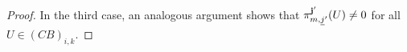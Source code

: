 \documentclass{amsart}
\numberwithin{equation}{section}
\newcommand{\bfe}{\mathbf{e}}
\newcommand{\bff}{\mathbf{f}}
\newcommand{\bfg}{\mathbf{g}}
\newcommand{\bfh}{\mathbf{h}}
\newcommand{\tbfe}{{\tilde\bfe}}
\newcommand{\tbff}{{\tilde\bff}}
\newcommand{\tbfg}{{\tilde\bfg}}
\newcommand{\tbfh}{{\tilde\bfh}}
\newcommand{\uj}{{\underline j}}
\newcommand\udim{{\underline{\dim}\, }}
\newcommand{\Gr}{\mathrm{Gr}}
\begin{document}
\begin{proof}
In the third case, an analogous argument shows that $\pi^{\bf j'}_{m,\uj'}(U)\neq 0$ for all $U\in (CB)_{i,k}$.



\begin{comment}
We proceed by induction and combine the two maps $\Psi_1$ and $\Psi_2$ and obtain a map
\[\Psi:\Gr^{\tilde Q}_\tbfe(\tilde P_{m+1}^{(k-1)})\to\bigsqcup_{\tbff+\tbfg+\tbfh=\tbfe} \Gr^{\tilde Q}_\tbff( P(m,k))\times \Gr^{\tilde Q}_\tbfg(\tau\tilde P_{m+1}^{(k)})\times \Gr^{\tilde Q}_\tbfh(\tilde P_{m+1}^{(k)}).\]

By Lemma \ref{directsums} and induction hypothesis every quiver Grassmannian on the right hand side has a cell decomposition. The second part of the Proposition says that the fibres are empty if and only if $\tbfg=0$ and $\tbfh=\udim \tilde P_{m+1}^{(k)}$. In all other cases, the fiber dimension only depend on the dimension vectors $\tbff, \tbfg,\tbfh$ which means that they are constant over $\Gr^{\tilde Q}_\tbff( P(m,k))\times \Gr^{\tilde Q}_\tbfg(\tau\tilde P_{m+1}^{(k)})\times \Gr^{\tilde Q}_\tbfh(\tilde P_{m+1}^{(k)})$\footnote{actually this should already say that this is a vector bundle as the base space is smooth (all reps are exceptional), apply Lemma \ref{vb}?}. Analogously to Lemma \ref{directsums}, we can conclude that this induces trivial bundles over every affine cell. In total, this yields a cell decomposition of the quiver Grassmannian $\Gr^{\tilde Q}_\tbfe(\tilde P_{m+1}^{(k-1)})$.
\end{comment}
\end{proof}


\end{document}
